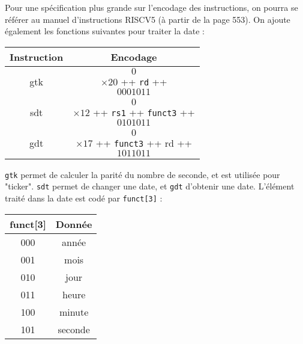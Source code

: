 \documentclass{article}
\begin{document}
Pour une spécification plus grande sur l'encodage des instructions, on pourra se référer au manuel d'instructions RISCV5 (à partir de la page 553). On ajoute également les fonctions suivantes pour traiter la date :

\begin{table}[h!]
\centering
\begin{tabular}{|c|c|}
\hline
\textbf{Instruction} & \textbf{Encodage} \\
\hline
gtk   & \[0\] $\times 20$ ++ \texttt{rd} ++ \[0001011\] \\
sdt   & \[0\] $\times 12$ ++ \texttt{rs1} ++ \texttt{funct3} ++ \[0101011\] \\
gdt   & \[0\] $\times 17$ ++ \texttt{funct3} ++ rd ++ \[1011011\] \\
\hline
\end{tabular}
\end{table}

\texttt{gtk} permet de calculer la parité du nombre de seconde, et est utilisée pour "ticker". \texttt{sdt} permet de changer une date, et \texttt{gdt} d'obtenir une date. L'élément traité dans la date est codé par \texttt{funct[3]} : 

\begin{table}[h!]
\centering
\begin{tabular}{|c|c|}
\hline
\textbf{funct[3]} & \textbf{Donnée} \\
\hline
000   & année \\
001  & mois \\
010  & jour \\
011  & heure \\
100  & minute \\
101  & seconde  \\
\hline
\end{tabular}
\end{table}


\end{document}
